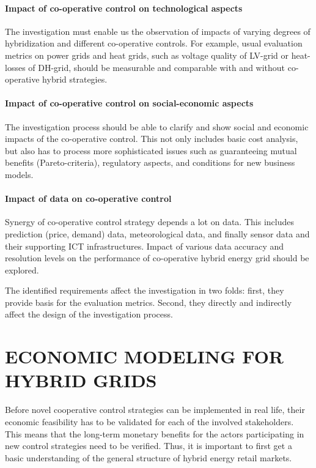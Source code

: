 \documentclass[a4paper,twoside]{article}
\begin{document}
\paragraph{Impact of co-operative control on technological aspects}
The investigation must enable us the observation of impacts of
varying degrees of hybridization and different co-operative
controls. For example, usual evaluation metrics on power grids and
heat grids, such as voltage quality of LV-grid or heat-losses of
DH-grid, should be measurable and comparable with and without
co-operative hybrid strategies. 

\paragraph{Impact of co-operative control on social-economic aspects} 
The investigation process should be able to clarify and show social
and economic impacts of the co-operative control. This not only
includes basic cost analysis, but also has to process more
sophisticated issues such as guaranteeing mutual benefits
(Pareto-criteria), regulatory aspects, and conditions for new business
models. 

\paragraph{Impact of data on co-operative control}
Synergy of co-operative control strategy depends a lot on data. 
This includes prediction (price, demand) data, meteorological data,
and finally sensor data and their supporting ICT
infrastructures. Impact of various data accuracy and resolution levels 
on the performance of co-operative hybrid energy grid should be
explored. 

The identified requirements affect the investigation in two folds:
first, they provide basis for the evaluation metrics. Second, they
directly and indirectly affect the design of the investigation
process. 

     
\section{\uppercase{Economic Modeling for Hybrid Grids}}
\label{sec:econ} 
Before novel cooperative control strategies can be implemented in real
life, their economic feasibility has to be validated for each of the
involved stakeholders. This means that the long-term monetary benefits
for the actors participating in new control strategies need to be
verified. Thus, it is important to first get a basic
understanding of the general structure of hybrid energy retail
markets.
\end{document}
